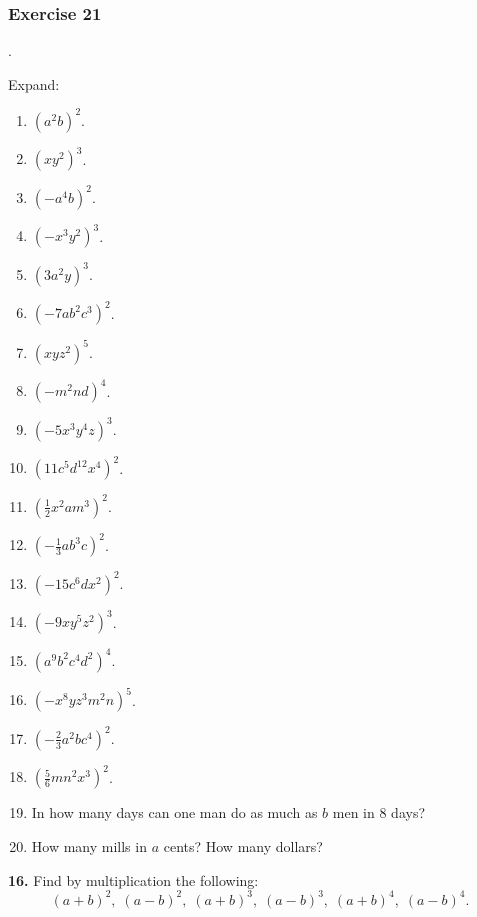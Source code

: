 \documentclass{book}
\begin{document}
\subsubsection*{Exercise 21}.

Expand:
\begin{enumerate}
\item $(a^2b)^2$.

\item $(xy^2)^3$.

\item $(-a^4b)^2$.

\item $(-x^3y^2)^3$.

\item $(3a^2y)^3$.

\item $(-7ab^2c^3)^2$.

\item $(xyz^2)^5$.

\item $(-m^2nd)^4$.

\item $(-5x^3y^4z)^3$.

\item $(11c^5d^12x^4)^2$.

\item $(\frac{1}{2}x^2am^3)^2$.

\item $(-\frac{1}{3}ab^3c)^2$.

\item $(-15c^6dx^2)^2$.

\item $(-9xy^5z^2)^3$.

\item $(a^9b^2c^4d^2)^4$.

\item $(-x^8yz^3m^2n)^5$.

\item $(-\frac{2}{3}a^2bc^4)^2$.

\item $(\frac{5}{6}mn^2x^3)^2$.

\item In how many days can one man do as much as $b$ men in 8
days?

\item How many mills in $a$ cents? How many dollars?
\end{enumerate}

\textbf{16.} Find by multiplication the following:
\[
(a+b)^2,\; (a-b)^2,\; (a+b)^3,\; (a-b)^3,\; (a+b)^4,\; (a-b)^4.
\]
\end{document}
